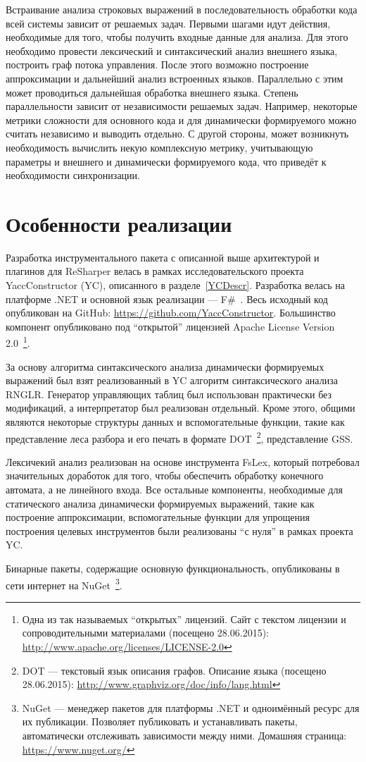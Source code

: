 Встраивание анализа строковых выражений в последовательность обработки кода всей системы зависит от решаемых задач. Первыми шагами идут действия, необходимые для того, чтобы получить входные данные для анализа. Для этого необходимо провести лексический и синтаксический анализ внешнего языка, построить граф потока управления. После этого возможно построение аппроксимации и дальнейший анализ встроенных языков. Параллельно с этим может проводиться дальнейшая обработка внешнего языка. Степень параллельности зависит от независимости решаемых задач. Например, некоторые метрики сложности для основного кода и для динамически формируемого можно считать независимо и выводить отдельно. С другой стороны, может возникнуть необходимость вычислить некую комплексную метрику, учитывающую параметры и внешнего и динамически формируемого кода, что приведёт к необходимости синхронизации.

\section{Особенности реализации}

Разработка инструментального пакета с описанной выше архитектурой и плагинов для ReSharper велась в рамках исследовательского проекта YaccConstructor (YC), описанного в разделе~\ref{YCDescr}. Разработка велась на платформе .NET и основной язык реализации --- F\#~\cite{FSharp}. Весь исходный код опубликован на GitHub: \url{https://github.com/YaccConstructor}. Большинство компонент опубликовано под ``открытой'' лицензией Apache License Version 2.0~\footnote{Одна из так называемых ``открытых'' лицензий. Сайт с текстом лицензии и сопроводительными материалами (посещено 28.06.2015): \url{http://www.apache.org/licenses/LICENSE-2.0}}. 

За основу алгоритма синтаксического анализа динамически формируемых выражений был взят реализованный в YC алгоритм синтаксического анализа RNGLR. Генератор управляющих таблиц был использован практически без модификаций, а интерпретатор был реализован отдельный. Кроме этого, общими являются некоторые структуры данных и вспомогательные функции, такие как представление леса разбора и его печать в формате DOT~\footnote{DOT --- текстовый язык описания графов. Описание языка (посещено 28.06.2015): \url{http://www.graphviz.org/doc/info/lang.html}}, представление GSS. 

Лексичекий анализ реализован на основе инструмента FsLex, который потребовал значительных доработок для того, чтобы обеспечить обработку конечного автомата, а не линейного входа. Все остальные компоненты, необходимые для статического анализа динамически формируемых выражений, такие как построение аппроксимации, вспомогательные функции для упрощения построения целевых инструментов были реализованы ``с нуля'' в рамках проекта YC.

Бинарные пакеты, содержащие основную функциональность, опубликованы в сети интернет на NuGet~\footnote{NuGet --- менеджер пакетов для платформы .NET и одноимённый ресурс для их публикации. Позволяет публиковать и устанавливать пакеты, автоматически отслеживать зависимости между ними.  Домашняя страница: \url{https://www.nuget.org/}}.

